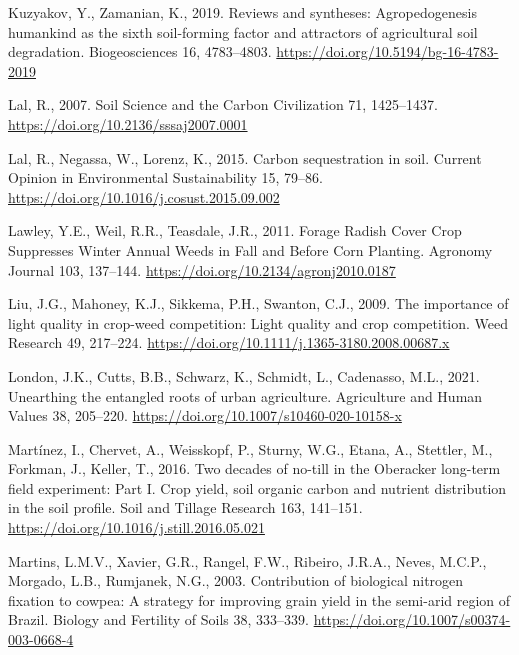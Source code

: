 \documentclass[
  12pt,
]{article}
\newlength{\cslhangindent}
\newlength{\cslentryspacingunit} %
\newenvironment{CSLReferences}[2] %
 {%
  \setlength{\parindent}{0pt}
  \ifodd #1
  \let\oldpar\par
  \def\par{\hangindent=\cslhangindent\oldpar}
  \fi
  \setlength{\parskip}{#2\cslentryspacingunit}
 }%
 {}
\begin{document}
\begin{CSLReferences}{1}{0}
\leavevmode{}%
Kuzyakov, Y., Zamanian, K., 2019. Reviews and syntheses: {Agropedogenesis} \textendash{} humankind as the sixth soil-forming factor and attractors of agricultural soil degradation. Biogeosciences 16, 4783--4803. \url{https://doi.org/10.5194/bg-16-4783-2019}

\leavevmode{}%
Lal, R., 2007. Soil {Science} and the {Carbon Civilization} 71, 1425--1437. \url{https://doi.org/10.2136/sssaj2007.0001}

\leavevmode{}%
Lal, R., Negassa, W., Lorenz, K., 2015. Carbon sequestration in soil. Current Opinion in Environmental Sustainability 15, 79--86. \url{https://doi.org/10.1016/j.cosust.2015.09.002}

\leavevmode{}%
Lawley, Y.E., Weil, R.R., Teasdale, J.R., 2011. Forage {Radish Cover Crop Suppresses Winter Annual Weeds} in {Fall} and {Before Corn Planting}. Agronomy Journal 103, 137--144. \url{https://doi.org/10.2134/agronj2010.0187}

\leavevmode{}%
Liu, J.G., Mahoney, K.J., Sikkema, P.H., Swanton, C.J., 2009. The importance of light quality in crop-weed competition: {Light} quality and crop competition. Weed Research 49, 217--224. \url{https://doi.org/10.1111/j.1365-3180.2008.00687.x}

\leavevmode{}%
London, J.K., Cutts, B.B., Schwarz, K., Schmidt, L., Cadenasso, M.L., 2021. Unearthing the entangled roots of urban agriculture. Agriculture and Human Values 38, 205--220. \url{https://doi.org/10.1007/s10460-020-10158-x}

\leavevmode{}%
Martínez, I., Chervet, A., Weisskopf, P., Sturny, W.G., Etana, A., Stettler, M., Forkman, J., Keller, T., 2016. Two decades of no-till in the {Oberacker} long-term field experiment: {Part I}. {Crop} yield, soil organic carbon and nutrient distribution in the soil profile. Soil and Tillage Research 163, 141--151. \url{https://doi.org/10.1016/j.still.2016.05.021}

\leavevmode{}%
Martins, L.M.V., Xavier, G.R., Rangel, F.W., Ribeiro, J.R.A., Neves, M.C.P., Morgado, L.B., Rumjanek, N.G., 2003. Contribution of biological nitrogen fixation to cowpea: A strategy for improving grain yield in the semi-arid region of {Brazil}. Biology and Fertility of Soils 38, 333--339. \url{https://doi.org/10.1007/s00374-003-0668-4}


\end{CSLReferences}
\end{document}
